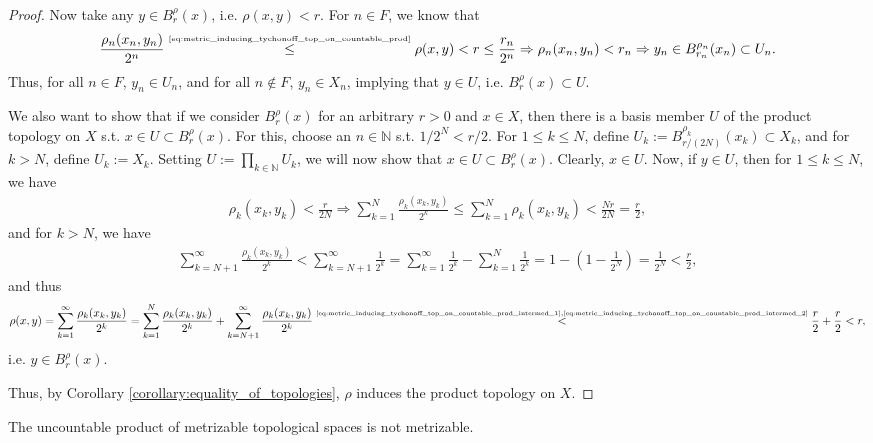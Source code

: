 \begin{proof}
	Now take any $y\in B_r^{\rho}(x)$, i.e. $\rho(x, y) < r$. For $n\in F$, we know that $$\frac{\rho_n(x_n, y_n) }{2^n} \overset{\tiny\eqref{eq:metric_inducing_tychonoff_top_on_countable_prod}}{\leq} \rho(x, y) < r \leq \frac{r_n}{2^n}\Rightarrow \rho_n(x_n, y_n) < r_n\Rightarrow y_n\in B_{r_n}^{\rho_n}(x_n) \subset U_n.$$
	Thus, for all $n\in F$, $y_n\in U_n$, and for all $n\notin F$, $y_n\in X_n$, implying that $y\in U$, i.e. $B_{r}^{\rho}(x)\subset U$.
	
	We also want to show that if we consider $B^{\rho}_{r}(x)$ for an arbitrary $r > 0$ and $x\in X$, then there is a basis member $U$ of the product topology on $X$ s.t. $x\in U\subset B^{\rho}_{r}(x)$. For this, choose an $n\in\mathbb N$ s.t. $1/2^N < r/2$. For $1\leq k\leq N$, define $U_k := B^{\rho_k}_{r/(2N)}(x_k) \subset X_k$, and for $k > N$, define $U_k := X_k$. Setting $U := \prod_{k\in \mathbb N}U_k$, we will now show that $x\in U\subset B^{\rho}_{r}(x)$. Clearly, $x\in U$. Now, if $y\in U$, then for $1\leq k\leq N$, we have
	\begin{align}\label{eq:metric_inducing_tychonoff_top_on_countable_prod_intermed_1}
		\rho_k(x_k, y_k) < \frac{r}{2N}\Rightarrow \sum_{k=1}^{N}\frac{\rho_k(x_k, y_k)}{2^k} \leq \sum_{k=1}^{N}\rho_k(x_k, y_k) < \frac{Nr}{2N} = \frac{r}{2},
	\end{align}
	and for $k > N$, we have 
	\begin{align}\label{eq:metric_inducing_tychonoff_top_on_countable_prod_intermed_2}
		\sum_{k = N + 1}^{\infty}\frac{\rho_k(x_k, y_k)}{2^k} < \sum_{k = N + 1}^{\infty}\frac{1}{2^k} = \sum_{k=1}^{\infty}\frac{1}{2^k} - \sum_{k=1}^{N}\frac{1}{2^k} = 1 - \left(1 - \frac{1}{2^N}\right) = \frac{1}{2^N} < \frac{r}{2},
	\end{align}
	and thus 
	\begin{align*}
		\rho(x, y) = \sum_{k=1}^{\infty}\frac{\rho_k(x_k, y_k)}{2^k} = \sum_{k=1}^{N}\frac{\rho_k(x_k, y_k)}{2^k} + \sum_{k=N+1}^{\infty}\frac{\rho_k(x_k, y_k)}{2^k} \overset{\tiny\eqref{eq:metric_inducing_tychonoff_top_on_countable_prod_intermed_1}, \eqref{eq:metric_inducing_tychonoff_top_on_countable_prod_intermed_2}}{<} \frac{r}{2} + \frac{r}{2} < r,
	\end{align*}
	i.e. $y\in B_r^{\rho}(x)$. 
	
	Thus, by Corollary \ref{corollary:equality_of_topologies}, $\rho$ induces the product topology on $X$.
\end{proof}

\begin{remark}
	The uncountable product of metrizable topological spaces is not metrizable.
\end{remark}

